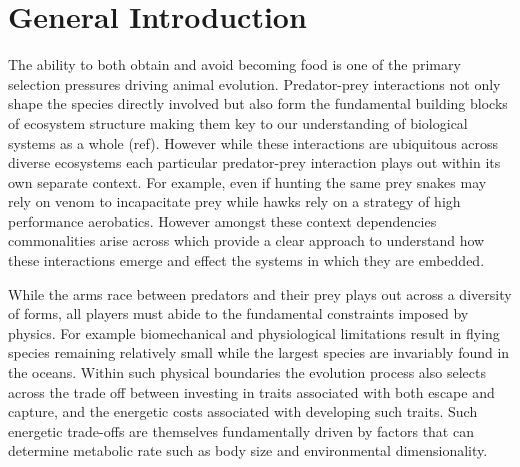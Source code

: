 \chapter{General Introduction}
\label{chap:introduction}%


\noindent
The ability to both obtain and avoid becoming food is one of the primary selection pressures driving animal evolution. Predator-prey interactions not only shape the species directly involved but also form the fundamental building blocks of ecosystem structure making them key to our understanding of biological systems as a whole (ref). However while these interactions are ubiquitous across diverse ecosystems each particular predator-prey interaction plays out within its own separate context. For example, even if hunting the same prey snakes may rely on venom to incapacitate prey while hawks rely on a strategy of high performance aerobatics. However amongst these context dependencies commonalities arise across which provide a clear approach to understand how these interactions emerge and effect the systems in which they are embedded.


While the arms race between predators and their prey plays out across a diversity of forms, all players must abide to the fundamental constraints imposed by physics. For example biomechanical and physiological limitations result in flying species remaining relatively small while the largest species are invariably found in the oceans. Within such physical boundaries the evolution process also selects across the trade off between investing in traits associated with both escape and capture, and the energetic costs associated with developing such traits. Such energetic trade-offs are themselves fundamentally driven by factors that can determine metabolic rate such as body size and environmental dimensionality. 


